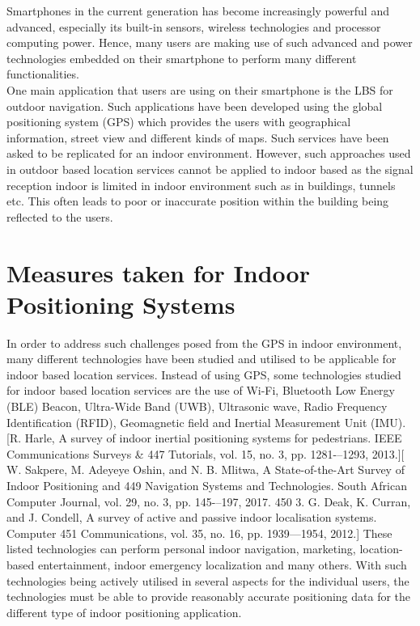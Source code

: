 \documentclass{l4proj}
\begin{document}
Smartphones in the current generation has become increasingly powerful and advanced, especially its built-in sensors, wireless technologies and processor computing power. Hence, many users are making use of such advanced and power technologies embedded on their smartphone to perform many different functionalities.\\

One main application that users are using on their smartphone is the LBS for outdoor navigation. Such applications have been developed using the global positioning system (GPS) which provides the users with geographical information, street view and different kinds of maps. Such services have been asked to be replicated for an indoor environment. However, such approaches used in outdoor based location services cannot be applied to indoor based as the signal reception indoor is limited in indoor environment such as in buildings, tunnels etc. This often leads to poor or inaccurate position within the building being reflected to the users.\\

\section{Measures taken for Indoor Positioning Systems}
In order to address such challenges posed from the GPS in indoor environment, many different technologies have been studied and utilised to be applicable for indoor based location services. Instead of using GPS, some technologies studied for indoor based location services are the use of Wi-Fi, Bluetooth Low Energy (BLE) Beacon, Ultra-Wide Band (UWB), Ultrasonic wave, Radio Frequency Identification (RFID), Geomagnetic field and Inertial Measurement Unit (IMU). [R. Harle, A survey of indoor inertial positioning systems for pedestrians. IEEE Communications Surveys &
447 Tutorials, vol. 15, no. 3, pp. 1281-–1293, 2013.][ W. Sakpere, M. Adeyeye Oshin, and N. B. Mlitwa, A State-of-the-Art Survey of Indoor Positioning and
449 Navigation Systems and Technologies. South African Computer Journal, vol. 29, no. 3, pp. 145-–197, 2017.
450 3. G. Deak, K. Curran, and J. Condell, A survey of active and passive indoor localisation systems. Computer
451 Communications, vol. 35, no. 16, pp. 1939—1954, 2012.] These listed technologies can perform personal indoor navigation, marketing, location-based entertainment, indoor emergency localization and many others. With such technologies being actively utilised in several aspects for the individual users, the technologies must be able to provide reasonably accurate positioning data for the different type of indoor positioning application.\\
\end{document}

